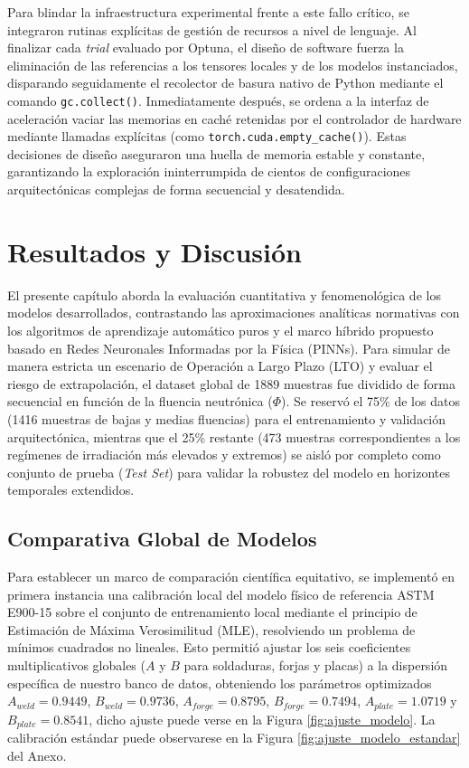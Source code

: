 \documentclass[a4paper, 12pt, twocolumn]{book}
\begin{document}
Para blindar la infraestructura experimental frente a este fallo crítico, se integraron rutinas explícitas de gestión de recursos a nivel de lenguaje. Al finalizar cada \textit{trial} evaluado por Optuna, el diseño de software fuerza la eliminación de las referencias a los tensores locales y de los modelos instanciados, disparando seguidamente el recolector de basura nativo de Python mediante el comando \texttt{gc.collect()}. Inmediatamente después, se ordena a la interfaz de aceleración vaciar las memorias en caché retenidas por el controlador de hardware mediante llamadas explícitas (como \texttt{torch.cuda.empty\_cache()}). Estas decisiones de diseño aseguraron una huella de memoria estable y constante, garantizando la exploración ininterrumpida de cientos de configuraciones arquitectónicas complejas de forma secuencial y desatendida.

\chapter{Resultados y Discusión}

El presente capítulo aborda la evaluación cuantitativa y fenomenológica de los modelos desarrollados, contrastando las aproximaciones analíticas normativas con los algoritmos de aprendizaje automático puros y el marco híbrido propuesto basado en Redes Neuronales Informadas por la Física (PINNs). Para simular de manera estricta un escenario de Operación a Largo Plazo (LTO) y evaluar el riesgo de extrapolación, el dataset global de 1889 muestras fue dividido de forma secuencial en función de la fluencia neutrónica ($\Phi$). Se reservó el 75\% de los datos (1416 muestras de bajas y medias fluencias) para el entrenamiento y validación arquitectónica, mientras que el 25\% restante (473 muestras correspondientes a los regímenes de irradiación más elevados y extremos) se aisló por completo como conjunto de prueba (\textit{Test Set}) para validar la robustez del modelo en horizontes temporales extendidos.

\section{Comparativa Global de Modelos}

Para establecer un marco de comparación científica equitativo, se implementó en primera instancia una calibración local del modelo físico de referencia ASTM E900-15 sobre el conjunto de entrenamiento local mediante el principio de Estimación de Máxima Verosimilitud (MLE), resolviendo un problema de mínimos cuadrados no lineales. Esto permitió ajustar los seis coeficientes multiplicativos globales ($A$ y $B$ para soldaduras, forjas y placas) a la dispersión específica de nuestro banco de datos, obteniendo los parámetros optimizados $A_{weld} = 0.9449$, $B_{weld} = 0.9736$, $A_{forge} = 0.8795$, $B_{forge} = 0.7494$, $A_{plate} = 1.0719$ y $B_{plate} = 0.8541$, dicho ajuste puede verse en la Figura \ref{fig:ajuste_modelo}. La calibración estándar puede observarese en la Figura \ref{fig:ajuste_modelo_estandar} del Anexo.
\end{document}
